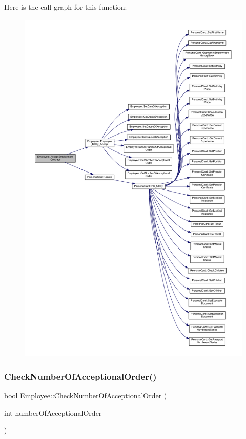 Here is the call graph for this function\+:
\nopagebreak
\begin{figure}[H]
\begin{center}
\leavevmode
\includegraphics[width=350pt]{class_employee_ad7a5d34564702bc8b880db1714c75413_cgraph}
\end{center}
\end{figure}
\mbox{\label{class_employee_a48638241e63b03873954369b285d1cd9}} 
\subsubsection{\texorpdfstring{Check\+Number\+Of\+Acceptional\+Order()}{CheckNumberOfAcceptionalOrder()}}
{\footnotesize\ttfamily bool Employee\+::\+Check\+Number\+Of\+Acceptional\+Order (\begin{DoxyParamCaption}\item[{int}]{number\+Of\+Acceptional\+Order }\end{DoxyParamCaption})}



